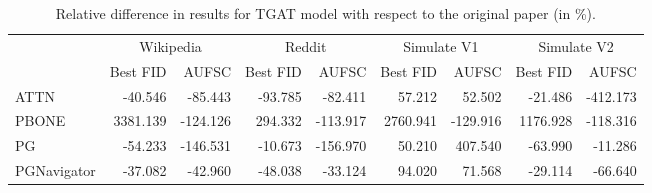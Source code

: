 \begin{table}
\centering
\caption{Relative difference in results for TGAT model with respect to the original paper (in \%).}
\label{tab:tgat_results_diff}
\begin{tabular}{lrrrrrrrr}
\toprule
 & \multicolumn{2}{c}{Wikipedia} & \multicolumn{2}{c}{Reddit} & \multicolumn{2}{c}{Simulate V1} & \multicolumn{2}{c}{Simulate V2} \\
 & Best FID & AUFSC & Best FID & AUFSC & Best FID & AUFSC & Best FID & AUFSC \\
\midrule
ATTN & -40.546 & -85.443 & -93.785 & -82.411 & 57.212 & 52.502 & -21.486 & -412.173 \\
PBONE & 3381.139 & -124.126 & 294.332 & -113.917 & 2760.941 & -129.916 & 1176.928 & -118.316 \\
PG & -54.233 & -146.531 & -10.673 & -156.970 & 50.210 & 407.540 & -63.990 & -11.286 \\
PGNavigator & -37.082 & -42.960 & -48.038 & -33.124 & 94.020 & 71.568 & -29.114 & -66.640 \\
\bottomrule
\end{tabular}
\end{table}
